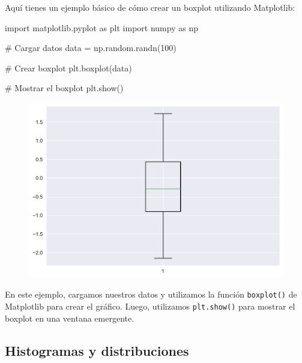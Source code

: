 \documentclass[
  a4paper,
]{article}
\newenvironment{Shaded}{}{}
\newcommand{\CommentTok}[1]{\textcolor[rgb]{0.42,0.45,0.49}{#1}}
\newcommand{\DecValTok}[1]{\textcolor[rgb]{0.00,0.36,0.77}{#1}}
\newcommand{\ImportTok}[1]{\textcolor[rgb]{0.01,0.18,0.38}{#1}}
\newcommand{\NormalTok}[1]{\textcolor[rgb]{0.14,0.16,0.18}{#1}}
\newcommand{\OperatorTok}[1]{\textcolor[rgb]{0.14,0.16,0.18}{#1}}
\begin{document}
Aquí tienes un ejemplo básico de cómo crear un boxplot utilizando
Matplotlib:

\begin{Shaded}
\begin{Highlighting}[]
\ImportTok{import}\NormalTok{ matplotlib.pyplot }\ImportTok{as}\NormalTok{ plt}
\ImportTok{import}\NormalTok{ numpy }\ImportTok{as}\NormalTok{ np}

\CommentTok{\# Cargar datos}
\NormalTok{data }\OperatorTok{=}\NormalTok{ np.random.randn(}\DecValTok{100}\NormalTok{)}

\CommentTok{\# Crear boxplot}
\NormalTok{plt.boxplot(data)}

\CommentTok{\# Mostrar el boxplot}
\NormalTok{plt.show()}
\end{Highlighting}
\end{Shaded}

\begin{figure}[H]

{\centering \includegraphics{index_files/figure-pdf/cell-26-output-1.pdf}

}

\end{figure}

En este ejemplo, cargamos nuestros datos y utilizamos la función
\texttt{boxplot()} de Matplotlib para crear el gráfico. Luego,
utilizamos \texttt{plt.show()} para mostrar el boxplot en una ventana
emergente.

\hypertarget{histogramas-y-distribuciones}{%
\subsection{Histogramas y
distribuciones}\label{histogramas-y-distribuciones}}
\end{document}
